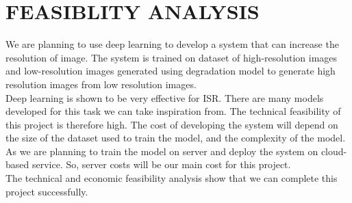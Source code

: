 \newpage
\section{FEASIBLITY ANALYSIS}
We are planning to use deep learning to develop a system that can increase the
resolution of image. The system is trained on dataset of high-resolution images and
low-resolution images generated using degradation model to generate high resolution
images from low resolution images.\\
Deep learning is shown to be very effective for ISR. There are many models
developed for this task we can take inspiration from. The technical feasibility of this
project is therefore high. The cost of developing the system will depend on the size of
the dataset used to train the model, and the complexity of the model. As we are planning
to train the model on server and deploy the system on cloud-based service. So, server
costs will be our main cost for this project. \\
The technical and economic feasibility analysis show that we can complete this
project successfully. 